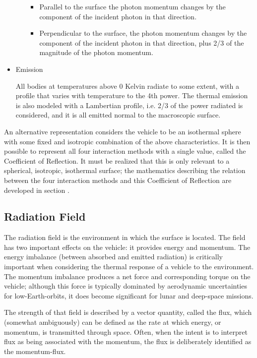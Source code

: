 \begin{itemize}
\begin{itemize}
\begin{itemize}\par
\item Parallel to the surface the photon momentum changes by the component of the incident photon in that direction.
\item Perpendicular to the surface, the photon momentum changes by the component of the incident photon in that direction, plus 2/3 of the magnitude of the photon momentum.
\end{itemize}
\end{itemize}
\item{Emission}\par
All bodies at temperatures above 0 Kelvin radiate to some extent, with a profile that varies with temperature to the 4th power.  The thermal emission is also modeled with a Lambertian profile, i.e. 2/3 of the power radiated is considered, and it is all emitted normal to the macroscopic surface.
\end{itemize}

An alternative representation considers the vehicle to be an isothermal sphere with some fixed and isotropic combination of the above characteristics.  It is then possible to represent all four interaction methods with a single value, called the Coefficient of Reflection.  It must be realized that this is only relevant to a spherical, isotropic, isothermal surface; the mathematics describing the relation between the four interaction methods and this Coefficient of Reflection are developed in section .



\subsection {Radiation Field}
The radiation field is the environment in which the surface is located.  The field has two important effects on the vehicle: it provides energy and momentum.  The energy imbalance (between absorbed and emitted radiation) is critically important when considering the thermal response of a vehicle to the environment.  The momentum imbalance produces a net force and corresponding torque on the vehicle; although this force is typically dominated by aerodynamic uncertainties for low-Earth-orbits, it does become significant for lunar and deep-space missions.

The strength of that field is described by a vector quantity, called the flux, which (somewhat ambiguously) can be defined as the rate at which energy, or momentum, is transmitted through space.  Often, when the intent is to interpret flux as being associated with the momentum, the flux is deliberately identified as the momentum-flux.

